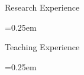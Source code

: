 \begin{small}

\begin{cvlist}{Research Experience}
\item
\begin{itemize}\itemsep=0.25em
\end{itemize}
\end{cvlist}

\begin{cvlist}{Teaching Experience}
\item
\begin{itemize}\itemsep=0.25em
\end{itemize}
\end{cvlist}


\end{small}
